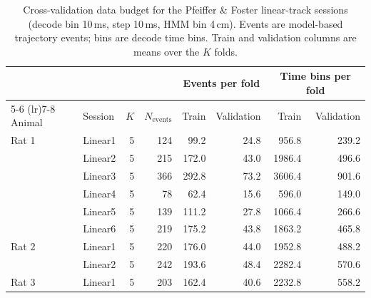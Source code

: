 \begin{table}[htbp]
  \centering
  \begin{tabular}{llrrrrrr}
    \toprule
    & & & & \multicolumn{2}{c}{Events per fold} & \multicolumn{2}{c}{Time bins per fold} \\
    \cmidrule(lr){5-6} \cmidrule(lr){7-8}
    Animal & Session & $K$ & $N_{\mathrm{events}}$ & Train & Validation & Train & Validation \\
    \midrule
    Rat 1 & Linear1 & 5 & 124 & 99.2 & 24.8 & 956.8 & 239.2 \\
     & Linear2 & 5 & 215 & 172.0 & 43.0 & 1986.4 & 496.6 \\
     & Linear3 & 5 & 366 & 292.8 & 73.2 & 3606.4 & 901.6 \\
     & Linear4 & 5 & 78 & 62.4 & 15.6 & 596.0 & 149.0 \\
     & Linear5 & 5 & 139 & 111.2 & 27.8 & 1066.4 & 266.6 \\
     & Linear6 & 5 & 219 & 175.2 & 43.8 & 1863.2 & 465.8 \\
    \addlinespace
    Rat 2 & Linear1 & 5 & 220 & 176.0 & 44.0 & 1952.8 & 488.2 \\
     & Linear2 & 5 & 242 & 193.6 & 48.4 & 2282.4 & 570.6 \\
    \addlinespace
    Rat 3 & Linear1 & 5 & 203 & 162.4 & 40.6 & 2232.8 & 558.2 \\
    \bottomrule
  \end{tabular}
  \caption{Cross-validation data budget for the Pfeiffer \& Foster linear-track sessions (decode bin 10\,ms, step 10\,ms, HMM bin 4\,cm). Events are model-based trajectory events; bins are decode time bins. Train and validation columns are means over the $K$ folds.}
  \label{tab:cv-budget-pfeiffer}
\end{table}
